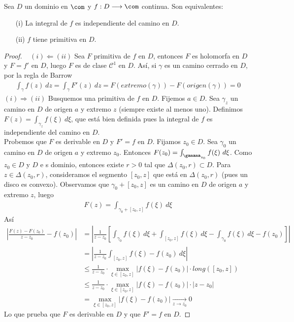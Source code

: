 \begin{teo}
Sea $D$ un dominio en $\com$ y $f: D \longrightarrow \com$ continua. Son equivalentes:
\begin{enumerate}
    \item[(i)] La integral de $f$ es independiente del camino en $D$.
    \item[(ii)] $f$ tiene primitiva en $D$.
\end{enumerate}
\end{teo}

\begin{proof}
\
\newline
$\boxed{(i) \Longleftarrow (ii)}$ Sea $F$ primitiva de $f$ en $D$, entonces $F$ es holomorfa en $D$ y $F = f'$ en $D$, luego $F$ es de clase $\mathscr{C}^1$ en $D$. Así, si $\gamma$ es un camino cerrado en $D$, por la regla de Barrow
\begin{align*}
    \int_{\gamma}{f(z) \ dz} = \int_{\gamma}{F'(z) \ dz} = F(extremo(\gamma)) - F(origen(\gamma)) = 0
\end{align*}
$\boxed{(i) \Longrightarrow (ii)}$ Busquemos una primitiva de $f$ en $D$. Fijemos $a \in D$. Sea $\gamma_z$ un camino en $D$ de origen $a$ y extremo $z$ (siempre existe al menos uno). Definimos $F(z) = \int_{\gamma_z}{f(\xi) \ d\xi}$, que está bien definida pues la integral de $f$ es independiente del camino en $D$.
\\
\newline
Probemos que $F$ es derivable en $D$ y $F' = f$ en $D$. Fijamos $z_0 \in D$. Sea $\gamma_0$ un camino en $D$ de origen $a$ y extremo $z_0$. Entonces $F(z_0) = \int_{\gamama_{z_0}}{f(\xi) \ d\xi}$. Como $z_0 \in D$ y $D$ e s dominio, entonces existe $r > 0$ tal que $\Delta(z_0,r) \subset D$. Para $z \in \Delta(z_0,r)$, consideramos el segmento $[z_0,z]$ que está en $\Delta(z_0,r)$ (pues un disco es convexo). Observamos que $\gamma_0 + [z_0,z]$ es un camino en $D$ de origen $a$ y extremo $z$, luego
\begin{align*}
    F(z) = \int_{\gamma_0 + [z_0,z]}{f(\xi) \ d\xi}
\end{align*}
Así
\begin{align*}
    \left| \frac{F(z) - F(z_0)}{z - z_0} - f(z_0)\right| &= \left| \frac{1}{z - z_0} \left[ \int_{\gamma_0}{f(\xi) \ d\xi} + \int_{[z_0,z]}{f(\xi) \ d\xi} - \int_{\gamma_0}{f(\xi) \ d\xi} - f(z_0) \right] \right| \\
    &= \left| \frac{1}{z - z_0} \int_{[z_0,z]}{f(\xi) - f(z_0)\ d\xi}\right| \\
    & \leq \frac{1}{z - z_0} \cdot \max_{\xi \in [z_0,z]}|f(\xi) - f(z_0)| \cdot long([z_0,z]) \\
    & \leq \frac{1}{z - z_0} \cdot \max_{\xi \in [z_0,z]}|f(\xi) - f(z_0)| \cdot |z-z_0| \\
    & = \max_{\xi \in [z_0,z]}|f(\xi) - f(z_0)| \xrightarrow[z \to z_0]{} 0
\end{align*}
Lo que prueba que $F$ es derivable en $D$ y que $F' = f$ en $D$.
\end{proof}

